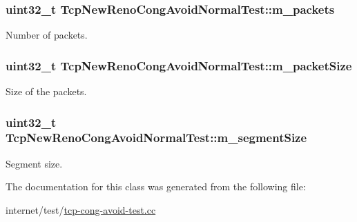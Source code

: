\subsubsection[{\texorpdfstring{m\+\_\+packets}{m_packets}}]{\setlength{\rightskip}{0pt plus 5cm}uint32\+\_\+t Tcp\+New\+Reno\+Cong\+Avoid\+Normal\+Test\+::m\+\_\+packets\hspace{0.3cm}{\ttfamily [private]}}\hypertarget{classTcpNewRenoCongAvoidNormalTest_a38dd5d011a9182374fb97d4b1c7f6f40}{}\label{classTcpNewRenoCongAvoidNormalTest_a38dd5d011a9182374fb97d4b1c7f6f40}


Number of packets. 

\subsubsection[{\texorpdfstring{m\+\_\+packet\+Size}{m_packetSize}}]{\setlength{\rightskip}{0pt plus 5cm}uint32\+\_\+t Tcp\+New\+Reno\+Cong\+Avoid\+Normal\+Test\+::m\+\_\+packet\+Size\hspace{0.3cm}{\ttfamily [private]}}\hypertarget{classTcpNewRenoCongAvoidNormalTest_af4fe88e11da0557e15a7021f872d1d43}{}\label{classTcpNewRenoCongAvoidNormalTest_af4fe88e11da0557e15a7021f872d1d43}


Size of the packets. 

\subsubsection[{\texorpdfstring{m\+\_\+segment\+Size}{m_segmentSize}}]{\setlength{\rightskip}{0pt plus 5cm}uint32\+\_\+t Tcp\+New\+Reno\+Cong\+Avoid\+Normal\+Test\+::m\+\_\+segment\+Size\hspace{0.3cm}{\ttfamily [private]}}\hypertarget{classTcpNewRenoCongAvoidNormalTest_a14e4dce9b59a6456f26c2736a38bf0ff}{}\label{classTcpNewRenoCongAvoidNormalTest_a14e4dce9b59a6456f26c2736a38bf0ff}


Segment size. 



The documentation for this class was generated from the following file\+:\begin{DoxyCompactItemize}
\item 
internet/test/\hyperlink{tcp-cong-avoid-test_8cc}{tcp-\/cong-\/avoid-\/test.\+cc}\end{DoxyCompactItemize}
